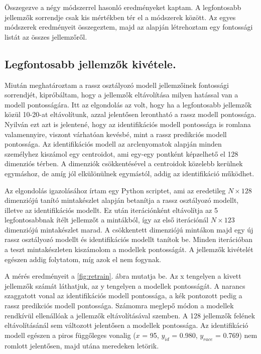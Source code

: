 Összegezve a négy módszerrel hasonló eredményeket kaptam. A legfontosabb jellemzők sorrendje csak kis mértékben tér el a módszerek között. Az egyes módszerek eredményeit összegeztem, majd az alapján létrehoztam egy fontossági listát az összes jellemzőről.

\subsection{Legfontosabb jellemzők kivétele.}

Miután meghatároztam a rassz osztályozó modell jellemzőinek fontossági sorrendjét, kipróbáltam, hogy a jellemzők eltávolítása milyen hatással van a modell pontosságára. Itt az elgondolás az volt, hogy ha a legfontosabb jellemzők közül 10-20-at eltávolítunk, azzal jelentősen lerontható a rassz modell pontossága. Nyilván ezt azt is jelentené, hogy az identifikációs modell pontossága is romlana valamennyire, viszont várhatóan kevésbé, mint a rassz predikciós modell pontossága. Az identifikációs modell az arclenyomatok alapján minden személyhez kiszámol egy centroidot, ami egy-egy pontként képzelhető el 128 dimenziós térben. A dimenziók csökkentésével a centroidok közelebb kerülnek egymáshoz, de amíg jól elkülönülnek egymástól, addig az identifikáció működhet.

Az elgondolás igazolásához írtam egy Python scriptet, ami az eredetileg $N \times 128$ dimenziójú tanító mintakészlet alapján betanítja a rassz osztályozó modellt, illetve az identifikációs modellt. Ez után iterációnként eltávolítja az 5 legfontosabbnak ítélt jellemzőt a mintákból, így az első iterációnál $N \times 123$ dimenziójú mintakészlet marad. A csökkentett dimenziójú mintákon majd egy új rassz osztályozó modellt és identifikációs modellt tanítok be. Minden iterációban a teszt mintakészleten kiszámolom a modellek pontosságát. A jellemzők kivételét egészen addig folytatom, míg azok el nem fogynak. 

A mérés eredményeit a \ref{fig:retrain}. ábra mutatja be. Az x tengelyen a kivett jellemzők számát láthatjuk, az y tengelyen a modellek pontosságát. A narancs szaggatott vonal az identifikációs modell pontossága, a kék pontozott pedig a rassz predikciós modell pontossága. Számomra meglepő módon a modellek rendkívül ellenállóak a jellemzők eltávolításával szemben. A 128 jellemzők felének eltávolításánál sem változott jelentősen a modellek pontossága. Az identifikáció modell egészen a piros függőleges vonalig ($x$ = 95, $y_{id}$ = 0.980, $y_{race}$ = 0.769) nem romlott jelentősen, majd utána meredeken letörik.

